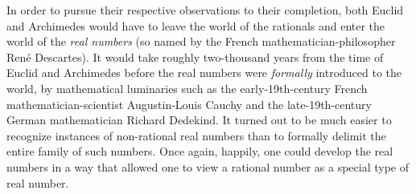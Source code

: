 In order to pursue their respective observations to their completion,
both Euclid and Archimedes would have to leave the world of the
rationals and enter the world of the {\it real numbers}
(so named by the French mathematician-philosopher Ren\'{e} Descartes).
It would take roughly two-thousand years from the time of Euclid and
Archimedes before the real numbers were {\em formally} introduced to
the world, by mathematical luminaries such as the early-19th-century
French mathematician-scientist Augustin-Louis Cauchy
and the late-19th-century German mathematician Richard Dedekind.
It turned out to be much easier to recognize instances of non-rational
real numbers than to formally delimit the entire family of such
numbers.  Once again, happily, one could develop the real numbers in a
way that allowed one to view a rational number as a special type of
real number.  

